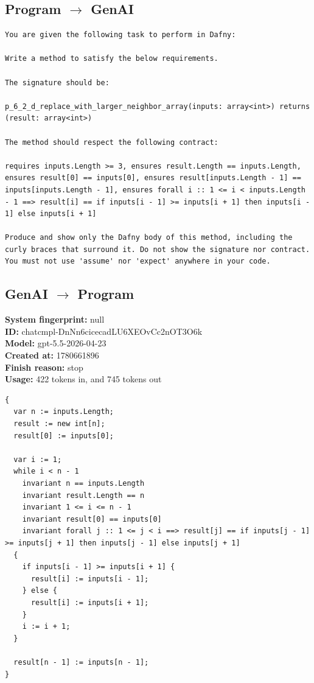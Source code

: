 \documentclass{article}
\begin{document}
\subsection*{Program $\rightarrow$ GenAI}
\begin{lstlisting}
You are given the following task to perform in Dafny:

Write a method to satisfy the below requirements.

The signature should be:

p_6_2_d_replace_with_larger_neighbor_array(inputs: array<int>) returns (result: array<int>)

The method should respect the following contract:

requires inputs.Length >= 3, ensures result.Length == inputs.Length, ensures result[0] == inputs[0], ensures result[inputs.Length - 1] == inputs[inputs.Length - 1], ensures forall i :: 1 <= i < inputs.Length - 1 ==> result[i] == if inputs[i - 1] >= inputs[i + 1] then inputs[i - 1] else inputs[i + 1]

Produce and show only the Dafny body of this method, including the curly braces that surround it. Do not show the signature nor contract. You must not use 'assume' nor 'expect' anywhere in your code.
\end{lstlisting}
\subsection*{GenAI $\rightarrow$ Program}
\textbf{System fingerprint: }null
\\\textbf{ID: }chatcmpl-DnNn6cicecadLU6XEOvCc2nOT3O6k
\\\textbf{Model: }gpt-5.5-2026-04-23
\\\textbf{Created at: }1780661896
\\\textbf{Finish reason: }stop
\\\textbf{Usage: }422 tokens in, and 745 tokens out
\begin{lstlisting}
{
  var n := inputs.Length;
  result := new int[n];
  result[0] := inputs[0];

  var i := 1;
  while i < n - 1
    invariant n == inputs.Length
    invariant result.Length == n
    invariant 1 <= i <= n - 1
    invariant result[0] == inputs[0]
    invariant forall j :: 1 <= j < i ==> result[j] == if inputs[j - 1] >= inputs[j + 1] then inputs[j - 1] else inputs[j + 1]
  {
    if inputs[i - 1] >= inputs[i + 1] {
      result[i] := inputs[i - 1];
    } else {
      result[i] := inputs[i + 1];
    }
    i := i + 1;
  }

  result[n - 1] := inputs[n - 1];
}
\end{lstlisting}
\end{document}
